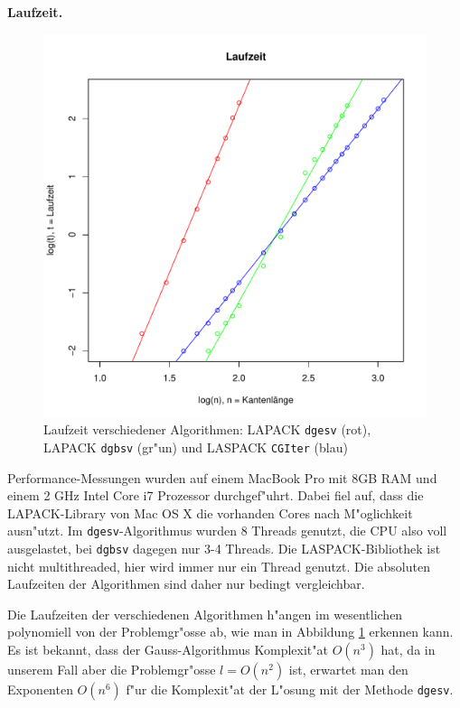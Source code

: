 {\bf Laufzeit.}
\begin{figure}
\begin{center}
\includegraphics[width=\hsize]{applications/runtime}
\end{center}
\caption{Laufzeit verschiedener Algorithmen: LAPACK {\tt dgesv} (rot),
LAPACK {\tt dgbsv} (gr"un)
und LASPACK {\tt CGIter} (blau)\label{runtime}}
\end{figure}
Performance-Messungen wurden auf einem MacBook Pro mit 8GB RAM und
einem 2 GHz Intel Core i7 Prozessor durchgef"uhrt. Dabei fiel auf, dass
die LAPACK-Library von Mac OS X die vorhanden Cores nach M"oglichkeit
ausn"utzt. Im {\tt dgesv}-Algorithmus wurden 8 Threads genutzt, die
CPU also voll ausgelastet, bei {\tt dgbsv} dagegen nur 3-4 Threads.
Die LASPACK-Bibliothek ist nicht multithreaded, hier wird immer nur ein
Thread genutzt. Die absoluten Laufzeiten der Algorithmen sind daher nur
bedingt vergleichbar.


Die Laufzeiten der verschiedenen Algorithmen h"angen im wesentlichen
polynomiell von der Problemgr"osse ab, wie man in Abbildung \ref{runtime}
erkennen kann.  Es ist bekannt, dass der Gauss-Algorithmus Komplexit"at
$O(n^3)$ hat, da in unserem Fall aber die Problemgr"osse $l=O(n^2)$ ist,
erwartet man den Exponenten $O(n^6)$ f"ur die Komplexit"at der L"osung
mit der Methode {\tt dgesv}.

